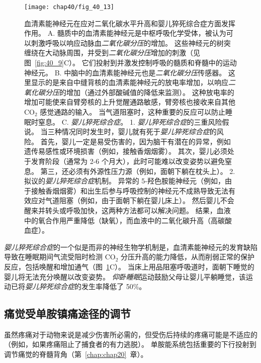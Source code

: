 \begin{figure}[htbp]
	\centering
	\texttt{[image: chap40/fig\_40\_13]}
	\caption{血清素能神经元在应对二氧化碳水平升高和婴儿猝死综合症方面发挥作用。
		A. 髓质中的血清素能神经元是中枢呼吸化学受体，被认为可以刺激呼吸以响应动脉血\textit{二氧化碳分压}的增加。
		这些神经元的树突缠绕在大动脉周围，并受到\textit{二氧化碳分压}增加的刺激（见图~\ref{fig:40_9}C）。
		它们投射到并激发控制呼吸的髓质和脊髓中的运动神经元。
		B. 中脑中的血清素能神经元也是\textit{二氧化碳分压}传感器。
		这里显示的是来自中缝背核的血清素能神经元的放电率增加，以响应\textit{二氧化碳分压}的增加（通过外部酸碱值的降低来监测）。
		这种放电率的增加可能使来自臂旁核的上升觉醒通路敏感，臂旁核也接收来自其他 CO$_2$ 感觉通路的输入。
		当气道阻塞时，这种重要的反应可以防止睡眠时窒息\cite{richerson2004serotonergic}。
		C. \textit{婴儿猝死综合症}。
		1. \textit{婴儿猝死综合症}的三重风险假说。
		当三种情况同时发生时，婴儿就有死于\textit{婴儿猝死综合症}的风险。
		首先，婴儿一定是易受伤害的，因为脑干有潜在的异常，例如遗传易感性或环境损害（例如，接触香烟烟雾）。 其次，婴儿必须处于发育阶段（通常为 2-6 个月大），此时可能难以改变姿势以避免窒息。
		第三，还必须有外源性压力源（例如，面朝下躺在枕头上）\cite{filiano1994perspective}。
		2. 拟议的\textit{婴儿猝死综合症}机制。
		异常的 5-羟色胺能神经元（例如，由于接触香烟烟雾）和出生后参与呼吸控制的神经元不成熟导致无法有效应对气道阻塞（例如，由于面朝下躺在婴儿床上）。
		然后婴儿不会醒来并转头或呼吸加快，这两种方法都可以解决问题。
		结果，血液中的氧合作用严重降低（缺氧），而血液中的二氧化碳升高（高碳酸血症）。}
	\label{fig:40_13}
\end{figure}


\textit{婴儿猝死综合症}的一个似是而非的神经生物学机制是，血清素能神经元的发育缺陷导致在睡眠期间气流受阻时检测 CO$_2$ 分压升高的能力降低，从而削弱正常的保护反应，包括唤醒和增加通气（图~\ref{fig:40_13}C）。
当床上用品阻塞呼吸道时，面朝下睡觉的婴儿将无法充分唤醒以改变姿势。
\textit{仰卧睡眠}运动鼓励父母让婴儿平躺睡觉，该运动已将\textit{婴儿猝死综合症}的发生率降低了 50\%。



\subsection{痛觉受单胺镇痛途径的调节}

虽然疼痛对于动物来说是减少伤害所必需的，但受伤后持续的疼痛可能是不适应的（例如，如果疼痛阻止了捕食者的有力逃脱）。
单胺能系统包括重要的下行投射到调节痛觉的脊髓背角（第~\ref{chap:chap20}~章）。


